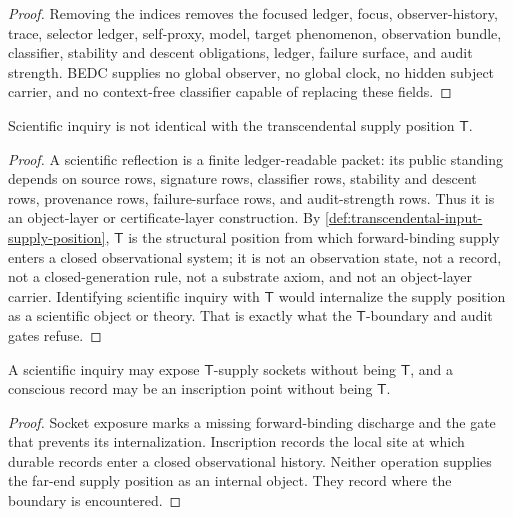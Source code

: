 \begin{proof}
Removing the indices removes the focused ledger, focus,
observer-history, trace, selector ledger, self-proxy, model, target
phenomenon, observation bundle, classifier, stability and descent
obligations, ledger, failure surface, and audit strength. BEDC supplies
no global observer, no global clock, no hidden subject carrier, and no
context-free classifier capable of replacing these fields.
\end{proof}

\begin{proposition}
\label{prop:scientific-inquiry-not-t}
Scientific inquiry is not identical with the transcendental supply
position $\mathsf{T}$.
\end{proposition}

\begin{proof}
A scientific reflection is a finite ledger-readable packet: its public
standing depends on source rows, signature rows, classifier rows,
stability and descent rows, provenance rows, failure-surface rows, and
audit-strength rows. Thus it is an object-layer or certificate-layer
construction. By \autoref{def:transcendental-input-supply-position},
$\mathsf{T}$ is the structural position from which forward-binding supply
enters a closed observational system; it is not an observation state, not
a record, not a closed-generation rule, not a substrate axiom, and not an
object-layer carrier. Identifying scientific inquiry with $\mathsf{T}$
would internalize the supply position as a scientific object or theory.
That is exactly what the $\mathsf{T}$-boundary and audit gates refuse.
\end{proof}

\begin{corollary}
\label{cor:t-sockets-do-not-make-scientist-t}
A scientific inquiry may expose $\mathsf{T}$-supply sockets without being
$\mathsf{T}$, and a conscious record may be an inscription point without
being $\mathsf{T}$.
\end{corollary}

\begin{proof}
Socket exposure marks a missing forward-binding discharge and the gate
that prevents its internalization. Inscription records the local site at
which durable records enter a closed observational history. Neither
operation supplies the far-end supply position as an internal object.
They record where the boundary is encountered.
\end{proof}

